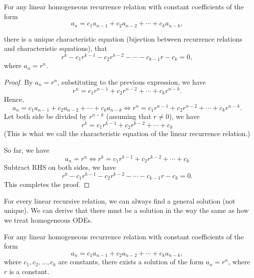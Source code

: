 \documentclass[12pt,a4paper]{article}
\begin{document}
\begin{proposition}\label{11:char}
For any linear homogeneous recurrence relation with constant coefficients of the form
\[
a_n = c_1 a_{n-1} + c_2 a_{n-2} + \cdots + c_k a_{n-k},
\]

there is a unique characteristic equation (bijection between recurrence relations and characteristic equations), that
\[
r^k-c_1 r^{k-1}-c_2 r^{k-2}-\cdots-c_{k-1} r-c_k=0,
\]
where $a_n = r^n$.
\end{proposition}
\begin{proof}
    By $a_n = r^n$, substituting to the previous expression, we have
    \[
    r^n=c_1 r^{n-1}+c_2 r^{n-2}+\cdots+c_k r^{n-k}.
    \]
    Hence, 
    \[
    a_n = c_1 a_{n-1} + c_2 a_{n-2} + \cdots + c_k a_{n-k} \iff
    r^n=c_1 r^{n-1}+c_2 r^{n-2}+\cdots+c_k r^{n-k}.
    \]
    Let both side be divided by $r^{n-k}$ (assuming that $r\neq0$), we have
    \[
    r^k=c_1 r^{k-1}+c_2 r^{k-2}+\cdots+c_k
    \]
    (This is what we call the characteristic equation of the linear recurrence relation.)
    
    So far, we have
    \[
    a_n=r^n \iff r^k=c_1 r^{k-1}+c_2 r^{k-2}+\cdots+c_k
    \]
    Subtract RHS on both sides, we have
    \[
    r^k-c_1 r^{k-1}-c_2 r^{k-2}-\cdots-c_{k-1} r-c_k=0.
    \]
    This completes the proof.
\end{proof}

For every linear recursive relation, we can always find a general solution (not unique). We can derive that there must be a solution in the way the same as how we treat homogeneous ODEs.
\begin{proposition}
For any linear homogeneous recurrence relation with constant coefficients of the form
\[
a_n = c_1 a_{n-1} + c_2 a_{n-2} + \cdots + c_k a_{n-k},
\]
where $c_1, c_2, \ldots, c_k$ are constants, there exists a solution of the form $a_n = r^n$, where $r$ is a constant.
\end{proposition}
\end{document}
